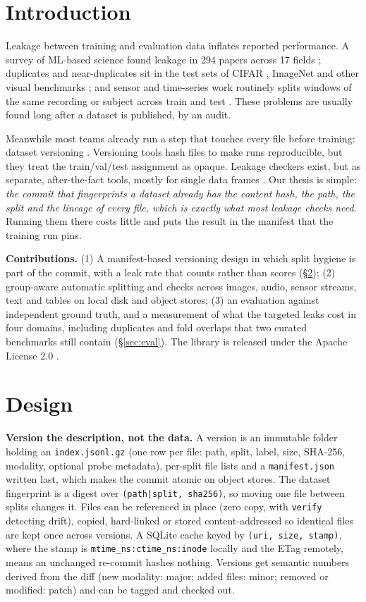 \documentclass[sigconf,nonacm]{acmart}
\begin{document}
\section{Introduction}
Leakage between training and evaluation data inflates reported performance. A survey of
ML-based science found leakage in 294 papers across 17 fields \cite{kapoor2023leakage};
duplicates and near-duplicates sit in the test sets of CIFAR \cite{barz2020cifair},
ImageNet \cite{kisel2024flaws} and other visual benchmarks \cite{ramos2025leakage}; and
sensor and time-series work routinely splits windows of the same recording or subject across
train and test \cite{roberts2017cv}. These problems are usually found long after a dataset is
published, by an audit.

Meanwhile most teams already run a step that touches every file before training: dataset
versioning \cite{dvc,lakefs,armbrust2020delta}. Versioning tools hash files to make runs
reproducible, but they treat the train/val/test assignment as opaque. Leakage checkers exist,
but as separate, after-the-fact tools, mostly for single data frames \cite{deepchecks,mlleak,leaklens}.
Our thesis is simple: \emph{the commit that fingerprints a dataset already has the content hash,
the path, the split and the lineage of every file, which is exactly what most leakage checks
need}. Running them there costs little and puts the result in the manifest that the training
run pins.

\textbf{Contributions.} (1) A manifest-based versioning design in which split hygiene is part of the
commit, with a leak rate that counts rather than scores (\S\ref{sec:design}); (2) group-aware automatic
splitting and checks across images, audio, sensor streams, text and tables on local disk and object
stores; (3) an evaluation against independent ground truth, and a measurement of what the targeted
leaks cost in four domains, including duplicates and fold overlaps that two curated benchmarks still
contain (\S\ref{sec:eval}). The library is released under the Apache License 2.0 \cite{dataset-fingerprint}.

\section{Design}\label{sec:design}
\textbf{Version the description, not the data.} A version is an immutable folder holding an
\texttt{index.jsonl.gz} (one row per file: path, split, label, size, SHA-256, modality, optional probe
metadata), per-split file lists and a \texttt{manifest.json} written last, which makes the commit
atomic on object stores. The dataset fingerprint is a digest over \texttt{(path|split, sha256)}, so
moving one file between splits changes it. Files can be referenced in place (zero copy, with
\texttt{verify} detecting drift), copied, hard-linked or stored content-addressed so identical files
are kept once across versions. A SQLite cache keyed by \texttt{(uri, size, stamp)}, where the stamp is
\texttt{mtime\_ns:ctime\_ns:inode} locally and the ETag remotely, means an unchanged re-commit hashes
nothing. Versions get semantic numbers derived from the diff (new modality: major; added files: minor;
removed or modified: patch) and can be tagged and checked out.
\end{document}
